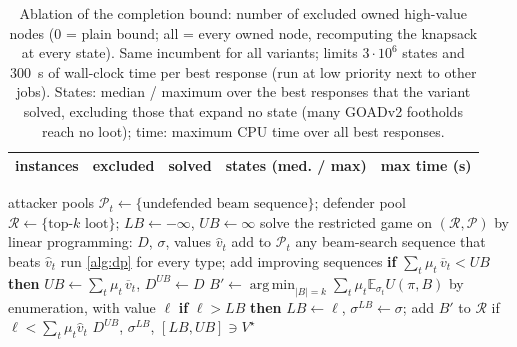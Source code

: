 \documentclass[runningheads]{llncs}
\newcommand{\Exp}{\mathbb{E}}
\DeclareMathOperator*{\argmin}{arg\,min}
\begin{document}
\begin{table}[t]
\centering
\caption{Ablation of the completion bound: number of excluded owned high-value nodes ($0$ = plain bound; all = every owned node, recomputing the knapsack at every state). Same incumbent for all variants; limits $3\cdot10^6$ states and 300~s of wall-clock time per best response (run at low priority next to other jobs). States: median / maximum over the best responses that the variant solved, excluding those that expand no state (many GOADv2 footholds reach no loot); time: maximum CPU time over all best responses.}\label{tab:ablation}
\small\setlength{\tabcolsep}{4pt}
\begin{tabular}{llrrr}
\toprule
instances & excluded & solved & states (med. / max) & max time (s)\\
\midrule
\end{tabular}
\end{table}

\begin{algorithm}[t]
\caption{Certified double oracle}\label{alg:do}
\begin{algorithmic}[1]
\State attacker pools $\mathcal P_t\gets\{\text{undefended beam sequence}\}$; defender pool $\mathcal R\gets\{\text{top-}k\text{ loot}\}$; $LB\gets-\infty$, $UB\gets\infty$
\Repeat
  \State solve the restricted game on $(\mathcal R,\mathcal P)$ by linear programming: $D$, $\sigma$, values $\hat v_t$
  \State add to $\mathcal P_t$ any beam-search sequence that beats $\hat v_t$
    \State run \cref{alg:dp} for every type; add improving sequences
    \State \textbf{if} $\sum_t\mu_t\,\overline{v}_t<UB$ \textbf{then} $UB\gets\sum_t\mu_t\,\overline{v}_t$, $D^{UB}\gets D$ 
  \EndIf
  \State $B'\gets\argmin_{|B|=k}\sum_t\mu_t\Exp_{\sigma_t}U(\pi,B)$ by enumeration, with value $\ell$
  \State \textbf{if} $\ell>LB$ \textbf{then} $LB\gets\ell$, $\sigma^{LB}\gets\sigma$; \quad add $B'$ to $\mathcal R$ if $\ell<\sum_t\mu_t\hat v_t$
\State \Return $D^{UB}$, $\sigma^{LB}$, $[LB,UB]\ni V^\star$
\end{algorithmic}
\end{algorithm}
\end{document}
